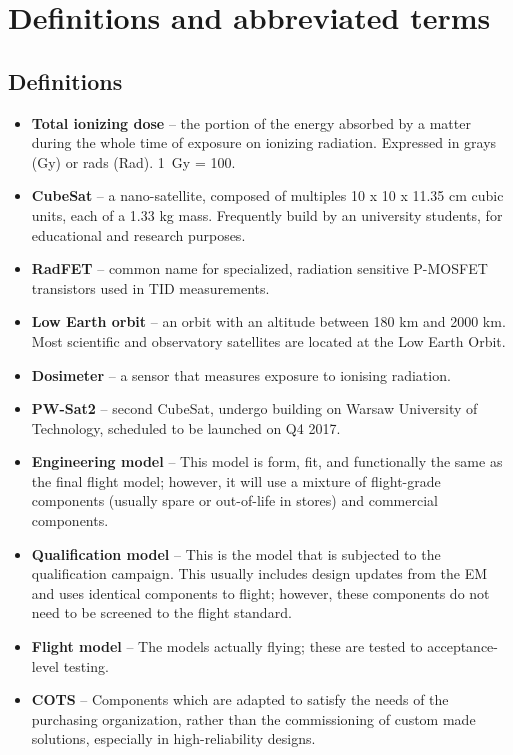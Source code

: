 \chapter{Definitions and abbreviated terms}

\section{Definitions}
\begin{itemize}
    \item \textbf{Total ionizing dose} -- the portion of the energy absorbed by a matter during the whole time of exposure on ionizing radiation. \cite{RadFET_PhD} Expressed in grays (Gy) or rads (Rad). \SI{1}{Gy} = \SI{100}{\rad}.

    \item \textbf{CubeSat} -- a nano-satellite, composed of multiples 10 x 10 x 11.35 cm cubic units, each of a 1.33 kg mass. Frequently build by an university students, for educational and research purposes. \cite{CDS}

    \item \textbf{RadFET} -- common name for specialized, radiation sensitive P-MOSFET transistors used in TID measurements.

    \item \textbf{Low Earth orbit} -- an orbit with an altitude between 180 km and 2000 km. Most scientific and observatory satellites are located at the Low Earth Orbit. \cite{NASA_orbits}

    \item \textbf{Dosimeter} -- a sensor that measures exposure to ionising radiation.

    \item \textbf{PW-Sat2} -- second CubeSat, undergo building on Warsaw University of Technology, scheduled to be launched on Q4 2017.

    \item \textbf{Engineering model} -- This model is form, fit, and functionally the same as the final flight model; however, it will use a mixture of flight-grade components (usually spare or out-of-life in stores) and commercial components. \cite{Models_space}

    \item \textbf{Qualification model} -- This is the model that is subjected to the qualification campaign. This usually includes design updates from the EM and uses identical components to flight; however, these components do not need to be screened to the flight standard. \cite{Models_space}

    \item \textbf{Flight model} -- The models actually flying; these are tested to acceptance-level testing. \cite{Models_space}

    \item \textbf{COTS} --  Components which are adapted to satisfy the needs of the purchasing organization, rather than the commissioning of custom made solutions, especially in high-reliability designs.

\end{itemize}

